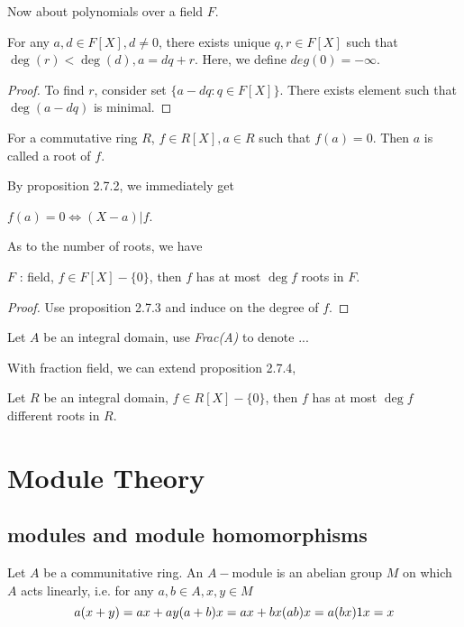 \documentclass[11pt,fleqn]{book} %
\begin{document}
\begin{CJK}{UTF8}{gkai}
Now about polynomials over a field $F$.
\begin{proposition}
	[带余除法] For any $a,d \in F[X], d \neq 0$, there exists unique $q,r \in F[X]$ such that $\deg (r) <\deg (d), a = dq + r$. Here, we define $deg (0) = -\infty$.
\end{proposition}
\begin{proof}
	To find $r$, consider set $\{a - dq : q \in F[X]\}$. There exists element such that $\deg(a - dq)$ is minimal.	
\end{proof}

\begin{definition}
	[root] For a commutative ring $R$, $f \in R[X], a \in R$ such that $f(a) = 0$. Then $a$ is called a root of $f$.
\end{definition}

By proposition 2.7.2, we immediately get 
\begin{proposition}
	$f(a) = 0 \iff (X - a) | f$.
\end{proposition}

As to the number of roots, we have 
\begin{proposition}
	$F$ : field, $f \in F[X]-\{0\}$, then $f$ has at most $\deg f$ roots in $F$.
\end{proposition}
\begin{proof}
	Use proposition 2.7.3 and induce on the degree of $f$.
\end{proof}

\begin{definition}
	 Let $A$ be an integral domain, use {\it Frac(A)} to denote ... 
\end{definition}

With fraction field, we can extend proposition 2.7.4,
\begin{lemma}
	Let $R$ be an integral domain, $f \in R[X] - \{0\}$, then $f$ has at most $\deg f$ different roots in $R$.	
\end{lemma}

\chapter{Module Theory}

\section{modules and module homomorphisms}
\begin{definition}
	Let $A$ be a communitative ring. An $A-$module is an abelian group $M$ on which $A$ acts linearly, i.e. for any $a,b \in A, x,y \in M$
	\[
		a(x+y) = ax + ay \\
		(a+b)x = ax + bx \\
		(ab)x = a(bx) \\
		1x = x\]
\end{definition}


\end{CJK}
\end{document}
